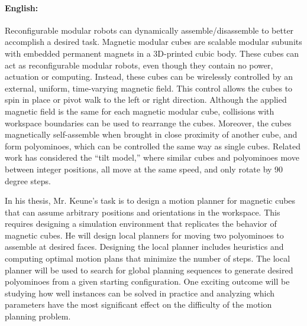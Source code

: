 \documentclass[11pt,a4paper,twoside,titlepage]{scrbook}
\theoremstyle{definition}
\begin{document}
\newpage

\paragraph{English:}
Reconfigurable modular robots can dynamically assemble/disassemble to better accomplish a desired task.
Magnetic modular cubes are scalable modular subunits with embedded permanent magnets in a 3D-printed cubic body.
These cubes can act as reconfigurable modular robots, even though they contain no power, actuation or computing.
Instead, these cubes can be wirelessly controlled by an external, uniform, time-varying magnetic field.
This control allows the cubes to spin in place or pivot walk to the left or right direction.
Although the applied magnetic field is the same for each magnetic modular cube, collisions with workspace boundaries can be used to rearrange the cubes.
Moreover, the cubes magnetically self-assemble when brought in close proximity of another cube, and form polyominoes, which can be controlled the same way as single cubes.  
Related work has considered the “tilt model,” where similar cubes and polyominoes move between integer positions, all move at the same speed, and only rotate by 90 degree steps.

In his thesis, Mr. Keune's task is to design a motion planner for magnetic cubes that can assume arbitrary positions and orientations in the workspace.
This requires designing a simulation environment that replicates the behavior of magnetic cubes.
He will design local planners for moving two polyominoes to assemble at desired faces.
Designing the local planner includes heuristics and computing optimal motion plans that minimize the number of steps.
The local planner will be used to search for global planning sequences to generate desired polyominoes from a given starting configuration.
One exciting outcome will be studying how well instances can be solved in practice and analyzing which parameters have the most significant effect on the difficulty of the motion planning problem. 
	
	
	
	\tableofcontents
	
	
	
	\mainmatter
	
	
	
	
	
	
\end{document}
